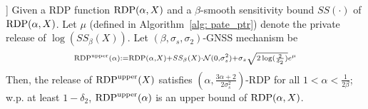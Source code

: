 \begin{lemma}]
Given a RDP function $\mathrm{RDP}(\alpha, X)$ and a $\beta$-smooth sensitivity bound $SS(\cdot)$ of $\mathrm{RDP}(\alpha, X)$. Let $\mu$ (defined in Algorithm~\ref{alg: pate_ptr}) denote the private release of $\log(SS_\beta(X))$. Let $(\beta, \sigma_s, \sigma_2)$-GNSS mechanism be 
\[\scriptstyle
\mathrm{RDP}^{\text{upper}}(\alpha):=\mathrm{RDP}(\alpha, X) + SS_\beta(X) \cdot \mathcal{N}(0, \sigma_s^2) + \sigma_s \sqrt{2\log(\frac{2}{\delta_2}) } e^{\mu} \]
	 Then, the release of $\mathrm{RDP}^{\text{upper}}(X)$ satisfies $(\alpha, \frac{3\alpha +2}{2\sigma_s^2})$-RDP for all $1<\alpha < \frac{1}{2\beta}$; w.p. at least $1-\delta_2$, $\mathrm{RDP}^{\text{upper}}(\alpha)$ is an upper bound of $\mathrm{RDP}(\alpha, X)$.
\vspace{-2mm}
\end{lemma}


